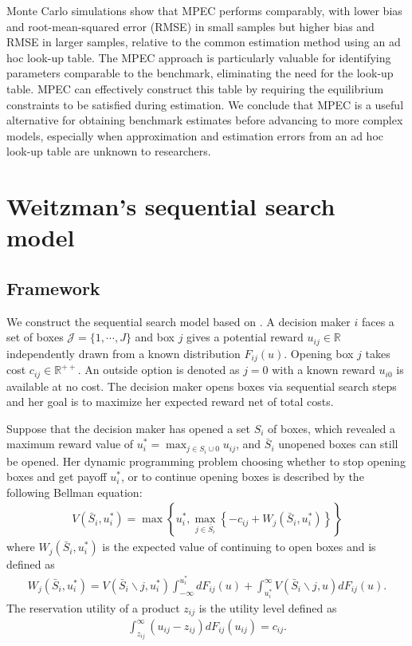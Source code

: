 \documentclass[12pt]{article}
\begin{document}
Monte Carlo simulations show that MPEC performs comparably, with lower bias and root-mean-squared error (RMSE) in small samples but higher bias and RMSE in larger samples, relative to the common estimation method using an ad hoc look-up table. The MPEC approach is particularly valuable for identifying parameters comparable to the benchmark, eliminating the need for the look-up table. MPEC can
effectively construct this table by requiring the equilibrium constraints to be satisfied during estimation. We conclude that MPEC is a useful alternative for obtaining benchmark estimates before advancing to more complex models, especially when approximation and estimation errors from an ad hoc look-up table are unknown to researchers.




\section{Weitzman's sequential search model}

\subsection{Framework}
We construct the sequential search model based on \cite{weitzman1979optimal}.
A decision maker $i$ faces a set of boxes $\mathcal{J}=\{1,\cdots,J\}$ and box $j$ gives a potential reward $u_{ij}\in \mathbb{R}$ independently drawn from a known
distribution $F_{ij}(u)$.
Opening box $j$ takes cost $c_{ij}\in \mathbb{R}^{++}$. 
An outside option is denoted as $j = 0$ with a known reward $u_{i0}$ is available at no cost.
The decision maker
opens boxes via sequential search steps and her goal is to maximize her expected reward net of total costs.

Suppose that the decision maker has opened a set \(S_{i}\) of boxes,
which revealed a maximum reward value of \(u_{i}^{*}=\max _{j \in S_{i} \cup 0} u_{i j}\), and \(\bar{S}_{i}\) unopened boxes can still be
opened. 
Her dynamic programming problem choosing whether to stop opening boxes and get payoff \(u_{i}^{*}\), or to continue opening boxes is described by the following Bellman equation:
\begin{align}
    V\left(\bar{S}_{i}, u_{i}^{*}\right)=\max \left\{u_{i}^{*}, \max _{j \in \bar{S}_{i}}\left\{-c_{i j}+W_{j}\left(\bar{S}_{i}, u_{i}^{*}\right)\right\}\right\}\nonumber
\end{align}
where \(W_{j}\left(\bar{S}_{i}, u_{i}^{*}\right)\) is the expected value of continuing to open boxes and is
defined as
\begin{align}
    W_{j}\left(\bar{S}_{i}, u_{i}^{*}\right)=V\left(\bar{S}_{i} \backslash j, u_{i}^{*}\right) \int_{-\infty}^{u_{i}^{*}} d F_{i j}(u)+\int_{u_{i}^{*}}^{\infty} V\left(\bar{S}_{i} \backslash j, u\right) d F_{i j}(u).\nonumber
\end{align}
The reservation utility of a product \(z_{i j}\) is the utility level defined as 
\begin{align}
    \int_{z_{i j}}^{\infty}\left(u_{i j}-z_{i j}\right) d F_{i j}\left(u_{i j}\right)=c_{i j}.\nonumber
\end{align}
\end{document}
